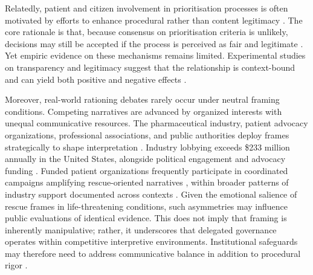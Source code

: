 \documentclass[11pt]{article}\usepackage[]{graphicx}\usepackage[]{xcolor}
\begin{document}
Relatedly, patient and citizen involvement in prioritisation processes is often motivated by efforts to enhance procedural rather than content legitimacy \parencite{Baltussen2021EDPPartI,Oortwijn2021EDPPartII}. The core rationale is that, because consensus on prioritisation criteria is unlikely, decisions may still be accepted if the process is perceived as fair and legitimate \parencite{Daniels2000AccountabilityReasonableness,DanielsVanDerWilt2016HTADeliberative,BaeroeBaltussen2014LegitimateLimitSetting}. Yet empiric evidence on these mechanisms remains limited. Experimental studies on transparency and legitimacy suggest that the relationship is context-bound and can yield both positive and negative effects \parencite{deFineLicht2014PolicyArea, deFineLichtNaurin2014TransparencyLegitimacy, deFineLicht2020JanusTransparency}.

Moreover, real-world rationing debates rarely occur under neutral framing conditions. Competing narratives are advanced by organized interests with unequal communicative resources. The pharmaceutical industry, patient advocacy organizations, professional associations, and public authorities deploy frames strategically to shape interpretation \parencite{Sell2004}. Industry lobbying exceeds \$233 million annually in the United States, alongside political engagement and advocacy funding \parencite{Steinbrook2020}. Funded patient organizations frequently participate in coordinated campaigns amplifying rescue-oriented narratives \parencite{Parker2019}, within broader patterns of industry support documented across contexts \parencite{Parker2019,Fabbri2020IndustryFundingPatientOrgs,Mulinari2020IndustryFundingPatientOrgsSweden}. Given the emotional salience of rescue frames in life-threatening conditions, such asymmetries may influence public evaluations of identical evidence. This does not imply that framing is inherently manipulative; rather, it underscores that delegated governance operates within competitive interpretive environments. Institutional safeguards may therefore need to address communicative balance in addition to procedural rigor \parencite{Gabe2012HerceptinCountervailingPowers}.
\end{document}
